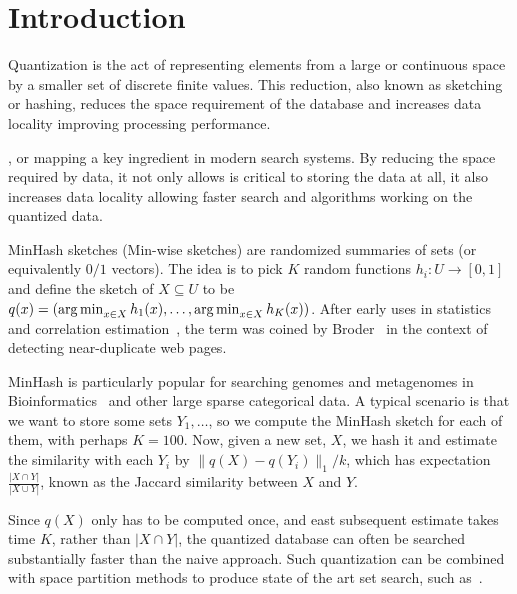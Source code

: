 
\section{Introduction}
Quantization is the act of representing elements from a large or continuous space by a smaller set of discrete finite values.
This reduction, also known as sketching or hashing, reduces the space requirement of the database and increases data locality improving processing performance.

, or mapping  a key ingredient in modern search systems.
By reducing the space required by data, it not only allows is critical to storing the data at all, it also increases data locality allowing faster search and algorithms working on the quantized data.

MinHash sketches (Min-wise sketches) are randomized summaries of sets (or equivalently $0/1$ vectors).
The idea is to pick $K$ random functions $h_i : U \to [0,1]$ and define the sketch of $X\subseteq U$ to be
$q(x) = (\operatorname*{arg\,min}_{x\in X}h_1(x), \dots, \operatorname*{arg\,min}_{x\in X}h_K(x))$.
After early uses in statistics~\cite{brewer1972selecting} and correlation estimation~\cite{flajolet1985probabilistic}, the term was coined by Broder~\cite{broder1997resemblance, broder1997syntactic} in the context of detecting near-duplicate web pages.

MinHash is particularly popular for searching genomes and metagenomes in Bioinformatics~\cite{ondov2016mash} and other large sparse categorical data.
A typical scenario is that we want to store some sets $Y_1, \dots$, so we compute the MinHash sketch for each of them, with perhaps $K=100$.
Now, given a new set, $X$, we hash it and estimate the similarity with each $Y_i$ by $\|q(X)-q(Y_i)\|_1/k$, which has expectation $\frac{|X\cap Y|}{|X\cup Y|}$, known as the Jaccard similarity between $X$ and $Y$.

Since $q(X)$ only has to be computed once, and east subsequent estimate takes time $K$, rather than $|X \cap Y|$, the quantized database can often be searched substantially faster than the naive approach.
Such quantization can be combined with space partition methods to produce state of the art set search, such as~\cite{christiani2018scalable}.

